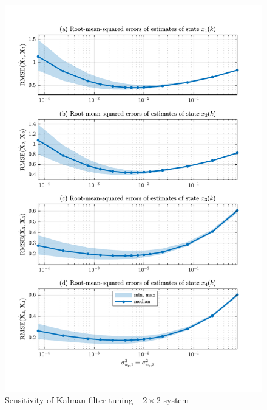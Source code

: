 \begin{figure}[htp]
	\centering
	\includegraphics[width=14cm]{images/rod_obs_sim2_3KF_Q_statplot.pdf}
	\caption{Sensitivity of Kalman filter tuning – $2\times2$ system}
	\label{fig:sim-sys-2x2-KF3-sensitivity}
\end{figure}